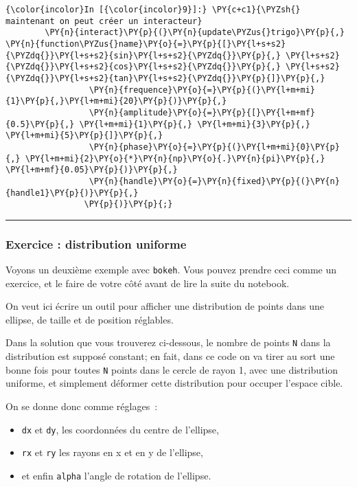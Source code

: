     \begin{Verbatim}[commandchars=\\\{\}]
{\color{incolor}In [{\color{incolor}9}]:} \PY{c+c1}{\PYZsh{} maintenant on peut créer un interacteur}
        \PY{n}{interact}\PY{p}{(}\PY{n}{update\PYZus{}trigo}\PY{p}{,} \PY{n}{function\PYZus{}name}\PY{o}{=}\PY{p}{[}\PY{l+s+s2}{\PYZdq{}}\PY{l+s+s2}{sin}\PY{l+s+s2}{\PYZdq{}}\PY{p}{,} \PY{l+s+s2}{\PYZdq{}}\PY{l+s+s2}{cos}\PY{l+s+s2}{\PYZdq{}}\PY{p}{,} \PY{l+s+s2}{\PYZdq{}}\PY{l+s+s2}{tan}\PY{l+s+s2}{\PYZdq{}}\PY{p}{]}\PY{p}{,}
                 \PY{n}{frequence}\PY{o}{=}\PY{p}{(}\PY{l+m+mi}{1}\PY{p}{,}\PY{l+m+mi}{20}\PY{p}{)}\PY{p}{,}
                 \PY{n}{amplitude}\PY{o}{=}\PY{p}{[}\PY{l+m+mf}{0.5}\PY{p}{,} \PY{l+m+mi}{1}\PY{p}{,} \PY{l+m+mi}{3}\PY{p}{,} \PY{l+m+mi}{5}\PY{p}{]}\PY{p}{,}
                 \PY{n}{phase}\PY{o}{=}\PY{p}{(}\PY{l+m+mi}{0}\PY{p}{,} \PY{l+m+mi}{2}\PY{o}{*}\PY{n}{np}\PY{o}{.}\PY{n}{pi}\PY{p}{,} \PY{l+m+mf}{0.05}\PY{p}{)}\PY{p}{,}
                 \PY{n}{handle}\PY{o}{=}\PY{n}{fixed}\PY{p}{(}\PY{n}{handle1}\PY{p}{)}\PY{p}{,}
                \PY{p}{)}\PY{p}{;}
\end{Verbatim}


    \begin{center}\rule{0.5\linewidth}{\linethickness}\end{center}

    \hypertarget{exercice-distribution-uniforme}{%
\subsubsection{Exercice : distribution
uniforme}\label{exercice-distribution-uniforme}}

    Voyons un deuxième exemple avec \texttt{bokeh}. Vous pouvez prendre ceci
comme un exercice, et le faire de votre côté avant de lire la suite du
notebook.

    On veut ici écrire un outil pour afficher une distribution de points
dans une ellipse, de taille et de position réglables.

Dans la solution que vous trouverez ci-dessous, le nombre de points
\texttt{N} dans la distribution est supposé constant; en fait, dans ce
code on va tirer au sort une bonne fois pour toutes \texttt{N} points
dans le cercle de rayon 1, avec une distribution uniforme, et simplement
déformer cette distribution pour occuper l'espace cible.

On se donne donc comme réglages~:

\begin{itemize}
\tightlist
\item
  \texttt{dx} et \texttt{dy}, les coordonnées du centre de l'ellipse,
\item
  \texttt{rx} et \texttt{ry} les rayons en x et en y de l'ellipse,
\item
  et enfin \texttt{alpha} l'angle de rotation de l'ellipse.
\end{itemize}

